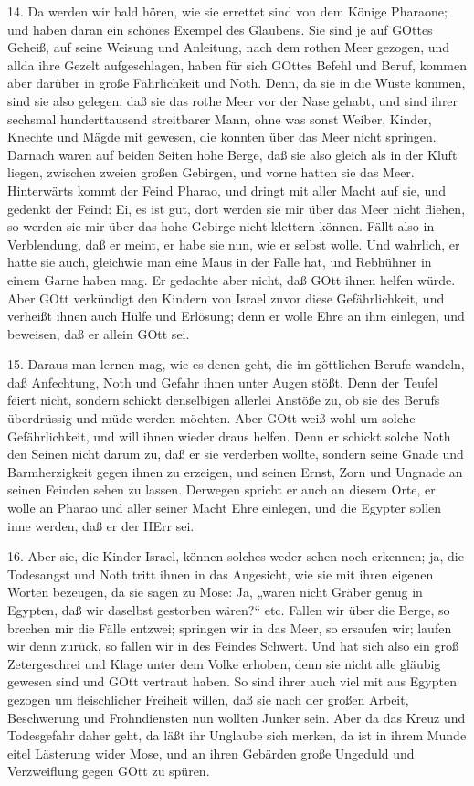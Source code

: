 14. Da werden wir bald hören, wie sie errettet sind von dem Könige Pharaone; und haben daran ein schönes Exempel des Glaubens. Sie sind je auf GOttes Geheiß, auf seine Weisung und Anleitung, nach dem rothen Meer gezogen, und allda ihre Gezelt aufgeschlagen, haben für sich GOttes Befehl und Beruf, kommen aber darüber in große Fährlichkeit und Noth. Denn, da sie in die Wüste kommen, sind sie also gelegen, daß sie das rothe Meer vor der Nase gehabt, und sind ihrer sechsmal hunderttausend streitbarer Mann, ohne was sonst Weiber, Kinder, Knechte und Mägde mit gewesen, die konnten über das Meer nicht springen. Darnach waren auf beiden Seiten hohe Berge, daß sie also gleich als in der Kluft liegen, zwischen zweien großen Gebirgen, und vorne hatten sie das Meer. Hinterwärts kommt der Feind Pharao, und dringt mit aller Macht auf sie, und gedenkt der Feind: Ei, es ist gut, dort werden sie mir über das Meer nicht fliehen, so werden sie mir über das hohe Gebirge nicht klettern können. Fällt also in Verblendung, daß er meint, er habe sie nun, wie er selbst wolle. Und wahrlich, er hatte sie auch, gleichwie man eine Maus in der Falle hat, und Rebhühner in einem Garne haben mag. Er gedachte aber nicht, daß GOtt ihnen helfen würde. Aber GOtt verkündigt den Kindern von Israel zuvor diese Gefährlichkeit, und verheißt ihnen auch Hülfe und Erlösung; denn er wolle Ehre an ihm einlegen, und beweisen, daß er allein GOtt sei.

15. Daraus man lernen mag, wie es denen geht, die im göttlichen Berufe wandeln, daß Anfechtung, Noth und Gefahr ihnen unter Augen stößt. Denn der Teufel feiert nicht, sondern schickt denselbigen allerlei Anstöße zu, ob sie des Berufs überdrüssig und müde werden möchten. Aber GOtt weiß wohl um solche Gefährlichkeit, und will ihnen wieder draus helfen. Denn er schickt solche Noth den Seinen nicht darum zu, daß er sie verderben wollte, sondern seine Gnade und Barmherzigkeit gegen ihnen zu erzeigen, und seinen Ernst, Zorn und Ungnade an seinen Feinden sehen zu lassen. Derwegen spricht er auch an diesem Orte, er wolle an Pharao und aller seiner Macht Ehre einlegen, und die Egypter sollen inne werden, daß er der HErr sei.

16. Aber sie, die Kinder Israel, können solches weder sehen noch erkennen; ja, die Todesangst und Noth tritt ihnen in das Angesicht, wie sie mit ihren eigenen Worten bezeugen, da sie sagen zu Mose: Ja, „waren nicht Gräber genug in Egypten, daß wir daselbst gestorben wären?“ etc. Fallen wir über die Berge, so brechen mir die Fälle entzwei; springen wir in das Meer, so ersaufen wir; laufen wir denn zurück, so fallen wir in des Feindes Schwert. Und hat sich also ein groß Zetergeschrei und
Klage unter dem Volke erhoben, denn sie nicht alle gläubig gewesen sind und GOtt vertraut haben. So sind ihrer auch viel mit aus Egypten gezogen um fleischlicher Freiheit willen, daß sie nach der großen Arbeit, Beschwerung und Frohndiensten nun wollten Junker sein. Aber da das Kreuz und Todesgefahr daher geht, da läßt ihr Unglaube sich merken, da ist in ihrem Munde eitel Lästerung wider Mose, und an ihren Gebärden große Ungeduld und Verzweiflung gegen GOtt zu spüren.

